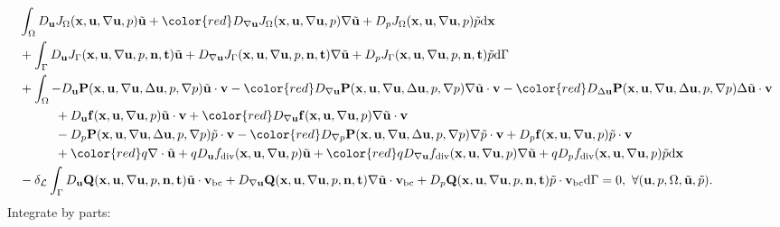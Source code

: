 \documentclass[oneside,11pt]{book}
\numberwithin{equation}{section}
\begin{document}
\begin{align*}
    &\int_\Omega D_{\bf u}J_\Omega({\bf x},{\bf u},\nabla{\bf u},p)\tilde{\bf u} + {\color{red}D_{\nabla{\bf u}}J_\Omega({\bf x},{\bf u},\nabla{\bf u},p)\nabla\tilde{\bf u}} + D_pJ_\Omega({\bf x},{\bf u},\nabla{\bf u},p)\tilde{p}{\rm d}{\bf x}\\
    &+ \int_\Gamma D_{\bf u}J_\Gamma({\bf x},{\bf u},\nabla{\bf u},p,{\bf n},{\bf t})\tilde{\bf u} + D_{\nabla{\bf u}}J_\Gamma({\bf x},{\bf u},\nabla{\bf u},p,{\bf n},{\bf t})\nabla\tilde{\bf u} + D_pJ_\Gamma({\bf x},{\bf u},\nabla{\bf u},p,{\bf n},{\bf t})\tilde{p}{\rm d}\Gamma\\
    &+ \int_\Omega -D_{\bf u}{\bf P}({\bf x},{\bf u},\nabla{\bf u},\Delta{\bf u},p,\nabla p)\tilde{\bf u}\cdot{\bf v} - {\color{red}D_{\nabla{\bf u}}{\bf P}({\bf x},{\bf u},\nabla{\bf u},\Delta{\bf u},p,\nabla p)\nabla\tilde{\bf u}\cdot{\bf v}} -  {\color{red}D_{\Delta{\bf u}}{\bf P}({\bf x},{\bf u},\nabla{\bf u},\Delta{\bf u},p,\nabla p)\Delta\tilde{\bf u}\cdot{\bf v}}\\
    &\hspace{1cm} + D_{\bf u}{\bf f}({\bf x},{\bf u},\nabla{\bf u},p)\tilde{\bf u}\cdot{\bf v} +  {\color{red}D_{\nabla{\bf u}}{\bf f}({\bf x},{\bf u},\nabla{\bf u},p)\nabla\tilde{\bf u}\cdot{\bf v}}\\
    &\hspace{1cm} - D_p{\bf P}({\bf x},{\bf u},\nabla{\bf u},\Delta{\bf u},p,\nabla p)\tilde{p}\cdot{\bf v} -  {\color{red}D_{\nabla p}{\bf P}({\bf x},{\bf u},\nabla{\bf u},\Delta{\bf u},p,\nabla p)\nabla\tilde{p}\cdot{\bf v}} + D_p{\bf f}({\bf x},{\bf u},\nabla{\bf u},p)\tilde{p}\cdot{\bf v}\\
    &\hspace{1cm} +  {\color{red}q\nabla\cdot\tilde{\bf u}} + qD_{\bf u}f_{\rm div}({\bf x},{\bf u},\nabla{\bf u},p)\tilde{\bf u} +  {\color{red}qD_{\nabla{\bf u}}f_{\rm div}({\bf x},{\bf u},\nabla{\bf u},p)\nabla\tilde{\bf u}} + qD_pf_{\rm div}({\bf x},{\bf u},\nabla{\bf u},p)\tilde{p}{\rm d}{\bf x}\\
    &- \delta_{\mathcal{L}}\int_\Gamma D_{\bf u}{\bf Q}({\bf x},{\bf u},\nabla{\bf u},p,{\bf n},{\bf t})\tilde{\bf u}\cdot{\bf v}_{\rm bc} + D_{\nabla{\bf u}}{\bf Q}({\bf x},{\bf u},\nabla{\bf u},p,{\bf n},{\bf t})\nabla\tilde{\bf u}\cdot{\bf v}_{\rm bc} + D_p{\bf Q}({\bf x},{\bf u},\nabla{\bf u},p,{\bf n},{\bf t})\tilde{p}\cdot{\bf v}_{\rm bc}{\rm d}\Gamma = 0,\ \forall({\bf u},p,\Omega,\tilde{\bf u},\tilde{p}).
\end{align*}
Integrate by parts:
\end{document}
